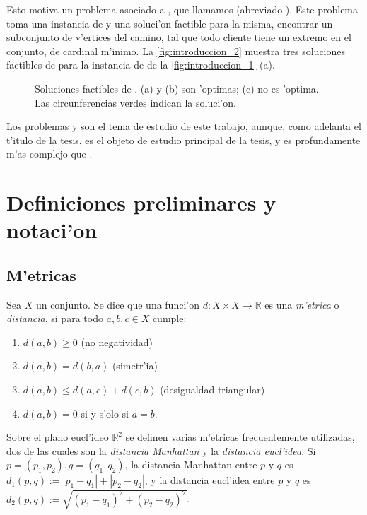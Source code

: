 Esto motiva un problema asociado a , que llamamos  (abreviado ). Este problema toma una instancia de  y una soluci'on factible para la misma, encontrar un subconjunto de v'ertices del camino, tal que todo cliente tiene un extremo en el conjunto, de cardinal m'inimo. La \autoref{fig:introduccion_2} muestra tres soluciones factibles de  para la instancia de  de la \autoref{fig:introduccion_1}-(a).\\

\begin{figure}[h]
	\begin{center}
		
	\end{center}		
	\caption{Soluciones factibles de . (a) y (b) son 'optimas; (c) no es 'optima. Las circunferencias verdes indican la soluci'on.}
	\label{fig:introduccion_2}
\end{figure}

Los problemas  y  son el tema de estudio de este trabajo, aunque, como adelanta el t'itulo de la tesis,  es el objeto de estudio principal de la tesis, y es profundamente m'as complejo que .

\section{Definiciones preliminares y notaci'on}

\subsection{M'etricas}

Sea $X$ un conjunto. Se dice que una funci'on $d: X \times X \to \mathbb{R}$ es una \textit{m'etrica} o \textit{distancia}, si para todo $a, b, c \in X$ cumple:

\begin{enumerate}
\item $d(a, b) \geq 0$ (no negatividad)
\item $d(a, b) = d(b, a)$ (simetr'ia)
\item $d(a, b) \leq d(a, c) + d(c, b)$ (desigualdad triangular)
\item $d(a, b) = 0$ si y s'olo si $a = b$.
\end{enumerate}

Sobre el plano eucl'ideo $\mathbb{R}^2$ se definen varias m'etricas frecuentemente utilizadas, dos de las cuales son la \textit{distancia Manhattan} y la \textit{distancia eucl'idea}. Si $p = (p_1, p_2), q = (q_1, q_2)$, la distancia Manhattan entre $p$ y $q$ es $d_1(p, q) := |p_1 - q_1| + |p_2 - q_2|$, y la distancia eucl'idea entre $p$ y $q$ es $d_2(p, q) := \sqrt{(p_1 - q_1)^2 + (p_2 - q_2)^2}$.

